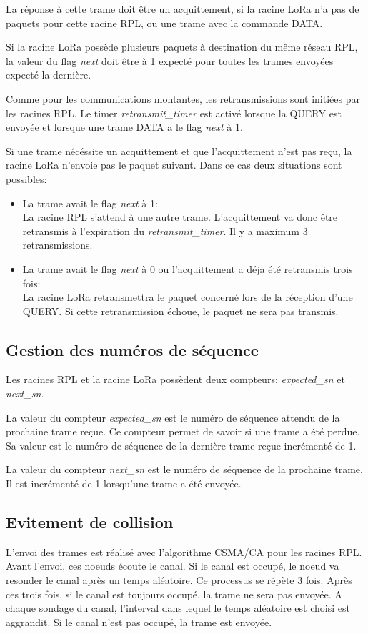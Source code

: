     La réponse à cette trame doit être un acquittement, si la racine LoRa n'a pas de paquets pour cette racine RPL, ou une trame avec la commande DATA.

    Si la racine LoRa possède plusieurs paquets à destination du même réseau RPL, la valeur du flag \textit{next} doit être à 1 expecté pour toutes les trames envoyées expecté la dernière.

    Comme pour les communications montantes, les retransmissions sont initiées par les racines RPL.
    Le timer \textit{retransmit\_timer} est activé lorsque la QUERY est envoyée et lorsque une trame DATA a le flag \textit{next} à 1.

    Si une trame nécéssite un acquittement et que l'acquittement n'est pas reçu, la racine LoRa n'envoie pas le paquet suivant. Dans ce cas deux situations sont possibles:
    \begin{itemize}
        \item La trame avait le flag \textit{next} à 1:\\
            La racine RPL s'attend à une autre trame. L'acquittement va donc être retransmis à l'expiration du \textit{retransmit\_timer}. Il y a maximum 3 retransmissions.
        \item La trame avait le flag \textit{next} à 0 ou l'acquittement a déja été retransmis trois fois:\\
            La racine LoRa retransmettra le paquet concerné lors de la réception d'une QUERY.
            Si cette retransmission échoue, le paquet ne sera pas transmis.
    \end{itemize}

\subsection{Gestion des numéros de séquence}
    Les racines RPL et la racine LoRa possèdent deux compteurs: \textit{expected\_sn} et \textit{next\_sn}.

    La valeur du compteur \textit{expected\_sn} est le numéro de séquence attendu de la prochaine trame reçue. Ce compteur permet de savoir si une trame a été perdue. Sa valeur est le numéro de séquence de la dernière trame reçue incrémenté de 1.

    La valeur du compteur \textit{next\_sn} est le numéro de séquence de la prochaine trame. Il est incrémenté de 1 lorsqu'une trame a été envoyée.

\subsection{Evitement de collision}
    L'envoi des trames est réalisé avec l'algorithme CSMA/CA pour les racines RPL.
    Avant l'envoi, ces noeuds écoute le canal. Si le canal est occupé, le noeud va resonder le canal après un temps aléatoire. Ce processus se répète 3 fois. Après ces trois fois, si le canal est toujours occupé, la trame ne sera pas envoyée. A chaque sondage du canal, l'interval dans lequel le temps aléatoire est choisi est aggrandit. Si le canal n'est pas occupé, la trame est envoyée.
